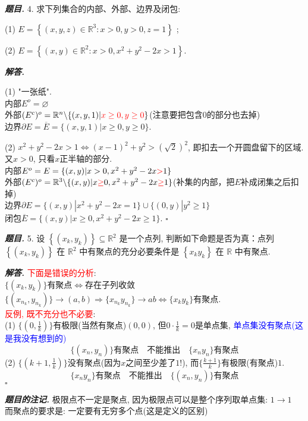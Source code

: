 \documentclass[10pt, a4paper, oneside]{ctexart}
\newenvironment{problem}{\begin{framed}\par\noindent\textbf{\textit{题目. }}}{\end{framed}\par}
\newenvironment{solution}{%
  \par\noindent\textbf{\textit{解答. }}\ignorespaces
}{%
  \hfill\ensuremath{\square}\par %
}
\newenvironment{note}{\par\noindent\textbf{\textit{题目的注记. }}\ignorespaces}{\par}
\begin{document}
\begin{problem}
4. 求下列集合的内部、外部、边界及闭包:

(1) $E=\left\{(x, y, z) \in \mathbb{R}^3: x>0, y>0, z=1\right\}$ ;

(2) $E=\left\{(x, y) \in \mathbb{R}^2: x>0, x^2+y^2-2 x>1\right\}$.
\end{problem}
\begin{solution}
    (1) "一张纸".\\内部$E^{o}=\varnothing$\\外部$(E^{c})^{o}=\mathbb{R}^n \backslash \{(x,y,1)|\textcolor{red}{x\geq 0 , y\geq 0}\}$(注意要把包含$0$的部分也去掉)\\边界$\partial E= \overline{E} = \{(x,y,1)|x\geq 0, y\geq 0\}$.

    (2) $x^2+y^2-2x>1\iff (x-1)^2+y^2>(\sqrt{2})^2$, 即扣去一个开圆盘留下的区域. 又$x>0$, 只看$x$正半轴的部分.\\内部$E^{o}=E=\{(x,y)|x>0, x^2+y^2-2x\textcolor{red}{>} 1\}$\\外部$(E^{c})^{o}=\mathbb{R}^3\backslash \{(x,y)|x\textcolor{red}{\geq}0,x^2+y^2-2x\textcolor{red}{\geq}1\}$(补集的内部，把$E$补成闭集之后扣掉)\\边界$\partial E=\{(x,y)|x^2+y^2-2x=1\}\cup \{(0,y)|y^2\geq 1\}$\\闭包$\overline{E}=\{(x,y)|x\geq 0, x^2+y^2-2x\geq 1\}$.
\end{solution}

\begin{problem}
5. 设 $\left\{\left(x_k, y_k\right)\right\} \subseteq \mathbb{R}^2$ 是一个点列, 判断如下命题是否为真：点列 $\left\{\left(x_k, y_k\right)\right\}$ 在 $\mathbb{R}^2$ 中有聚点的充分必要条件是 $\left\{x_k y_k\right\}$ 在 $\mathbb{R}$ 中有聚点.
\end{problem}
\begin{solution}\textcolor{red}{下面是错误的分析}: \\$\{(x_k,y_k)\}$有聚点$\iff$存在子列收敛$\{(x_{n_k},y_{n_k})\}\to (a,b)\Rightarrow \{x_{n_k}y_{n_k}\}\to ab \iff \{x_ky_k\}$有聚点.\\
\textcolor{red}{反例, 既不充分也不必要}: \\
(1) $\{(0,\frac{1}{k})\}$有极限(当然有聚点)$(0,0)$, 但$0\cdot \frac{1}{k}=0$是单点集, \textcolor{blue}{单点集没有聚点(这是我没有想到的)}
$$\{(x_n,y_n)\}\text{有聚点}\quad \text{不能推出}\quad \{x_ny_n\}\text{有聚点}$$
(2) $\{(k+1, \frac{1}{k})\}$没有聚点(因为$x$之间至少差了$1$!), 而$\{\frac{k+1}{k}\}$有极限(有聚点)$1$.
$$\{x_ny_n\}\text{有聚点}\quad \text{不能推出}\quad \{(x_n,y_n)\}\text{有聚点}$$
\end{solution}
\begin{note}
    极限点不一定是聚点, 因为极限点可以是整个序列取单点集: $1\to 1$\\
    而聚点的要求是: 一定要有无穷多个点(这是定义的区别)
\end{note}
\end{document}
